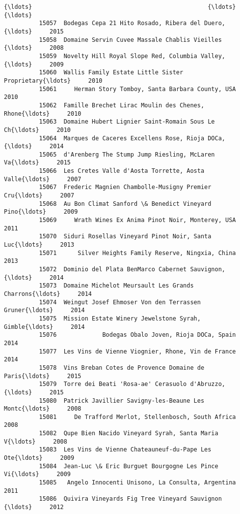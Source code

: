 \documentclass[11pt]{article}
\begin{document}
\begin{Verbatim}[commandchars=\\\{\}]
          {\ldots}                                                  {\ldots}      {\ldots}   
          15057  Bodegas Cepa 21 Hito Rosado, Ribera del Duero,{\ldots}     2015   
          15058  Domaine Servin Cuvee Massale Chablis Vieilles {\ldots}     2008   
          15059  Novelty Hill Royal Slope Red, Columbia Valley,{\ldots}     2009   
          15060  Wallis Family Estate Little Sister Proprietary{\ldots}     2010   
          15061     Herman Story Tomboy, Santa Barbara County, USA     2010   
          15062  Famille Brechet Lirac Moulin des Chenes, Rhone{\ldots}     2010   
          15063  Domaine Hubert Lignier Saint-Romain Sous Le Ch{\ldots}     2010   
          15064  Marques de Caceres Excellens Rose, Rioja DOCa,{\ldots}     2014   
          15065  d'Arenberg The Stump Jump Riesling, McLaren Va{\ldots}     2015   
          15066  Les Cretes Valle d'Aosta Torrette, Aosta Valle{\ldots}     2007   
          15067  Frederic Magnien Chambolle-Musigny Premier Cru{\ldots}     2007   
          15068  Au Bon Climat Sanford \& Benedict Vineyard Pino{\ldots}     2009   
          15069     Wrath Wines Ex Anima Pinot Noir, Monterey, USA     2011   
          15070  Siduri Rosellas Vineyard Pinot Noir, Santa Luc{\ldots}     2013   
          15071      Silver Heights Family Reserve, Ningxia, China     2013   
          15072  Dominio del Plata BenMarco Cabernet Sauvignon,{\ldots}     2014   
          15073  Domaine Michelot Meursault Les Grands Charrons{\ldots}     2014   
          15074  Weingut Josef Ehmoser Von den Terrassen Gruner{\ldots}     2014   
          15075  Mission Estate Winery Jewelstone Syrah, Gimble{\ldots}     2014   
          15076             Bodegas Obalo Joven, Rioja DOCa, Spain     2014   
          15077  Les Vins de Vienne Viognier, Rhone, Vin de France     2014   
          15078  Vins Breban Cotes de Provence Domaine de Paris{\ldots}     2015   
          15079  Torre dei Beati 'Rosa-ae' Cerasuolo d'Abruzzo,{\ldots}     2015   
          15080  Patrick Javillier Savigny-les-Beaune Les Montc{\ldots}     2008   
          15081     De Trafford Merlot, Stellenbosch, South Africa     2008   
          15082  Qupe Bien Nacido Vineyard Syrah, Santa Maria V{\ldots}     2008   
          15083  Les Vins de Vienne Chateauneuf-du-Pape Les Ote{\ldots}     2009   
          15084  Jean-Luc \& Eric Burguet Bourgogne Les Pince Vi{\ldots}     2009   
          15085   Angelo Innocenti Unisono, La Consulta, Argentina     2011   
          15086  Quivira Vineyards Fig Tree Vineyard Sauvignon {\ldots}     2012   
          

\end{Verbatim}
\end{document}
